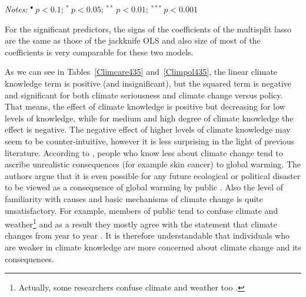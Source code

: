 \documentclass[a4paper,12pt]{article}
\begin{document}
{\begin{threeparttable}
\begin{small}
\begin{tabular}{lclccl}
\\
\hline
\end{tabular} 
\end{small}
\begin{tablenotes}
  \begin{footnotesize}
   \item \textit{Notes:} \hspace{0.2cm}$^{\bullet}~p<0.1$; $^{*}~p<0.05$; $^{**}~p<0.01$; $^{***}~p<0.001$
  \begin{adjustwidth}{1cm}{} \item For the significant predictors, the signs of the coefficients of the multisplit lasso are the same as those of the jackknife OLS and also size of most of the coefficients is very comparable for these two models.
     \end{adjustwidth}
 \singlespacing
  \end{footnotesize}
\end{tablenotes}
  \end{threeparttable} 
\par}
\linespread{1}

\vspace{1cm}

As we can see in Tables~\ref{Climcare435} and~\ref{Climpol435}, the linear climate knowledge term is positive (and insignificant), but the squared term is negative and significant for both climate seriousness and climate change versus policy. That means, the effect of climate knowledge is positive but decreasing for low levels of knowledge, while for medium and high degree of climate knowledge the effect is negative. The negative effect of higher levels of climate knowledge may seem to be counter-intuitive, however it is less surprising in the light of previous literature. According to \citet{reynolds2010now}, people who know less about climate change tend to ascribe unrealistic consequences (for example skin cancer) to global warming. The authors argue that it is even possible for any future ecological or political disaster to be viewed as a consequence of global warming by public \citep{WhatPplKnow94}. Also the level of familiarity with causes and basic mechanisms of climate change is quite unsatisfactory. For example, members of public tend to confuse climate and weather\footnote{Actually, some researchers confuse climate and weather too \citep{Hsiang2013, DesGreenstone2007}.} and as a result they mostly agree with the statement that climate changes from year to year \citep{reynolds2010now}. It is therefore understandable that individuals who are weaker in climate knowledge are more concerned about climate change and its consequences. 
\end{document}
